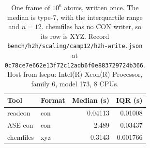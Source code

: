 \begin{table}[tbp]
\centering
\scriptsize
\caption{One frame of \(10^{6}\) atoms, written once.
The median is type-7, with the interquartile range and \(n{=}12\).
chemfiles has no CON writer, so its row is XYZ.
Record \texttt{bench/h2h/scaling/camp12/h2h-write.json} at \texttt{0c78ce7e662e13f72c12adb6f0e883729724b366}.
Host from lscpu: Intel(R) Xeon(R) Processor, family 6, model 173, 8 CPUs.}
\label{tab:camp12-write}
\begin{tabular}{@{}llrr@{}}
\toprule
Tool & Format & Median (s) & IQR (s) \\
\midrule
readcon & con & 0.04113 & 0.01008 \\
ASE eon & con & 2.489 & 0.03437 \\
chemfiles & xyz & 0.3143 & 0.001766 \\
\bottomrule
\end{tabular}
\end{table}

